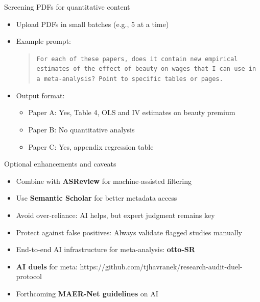 \documentclass{beamer} %
\begin{document}
\begin{frame}{Screening PDFs for quantitative content}
\begin{itemize}
  \item Upload PDFs in small batches (e.g., 5 at a time)
  \item Example prompt:
	
  \begin{quote}
    \texttt{For each of these papers, does it contain new empirical estimates of the effect of beauty on wages that I can use in a meta-analysis? Point to specific tables or pages.}
  \end{quote}
	
  \item Output format:
	
  \begin{itemize}
    \item Paper A: Yes, Table 4, OLS and IV estimates on beauty premium
    \item Paper B: No quantitative analysis
    \item Paper C: Yes, appendix regression table
  \end{itemize}
	
\end{itemize}
\end{frame}

\begin{frame}{Optional enhancements and caveats}
\begin{itemize}
  \item Combine with \textbf{ASReview} for machine-assisted filtering
  \item Use \textbf{Semantic Scholar} for better metadata access
  \item Avoid over-reliance: AI helps, but expert judgment remains key
  \item Protect against false positives: Always validate flagged studies manually
	  \item End-to-end AI infrastructure for meta-analysis: \textbf{otto-SR}
		\item \textbf{AI duels} for meta: https://github.com/tjhavranek/research-audit-duel-protocol
		\item Forthcoming \textbf{MAER-Net guidelines} on AI
\end{itemize}
\end{frame}
\end{document}
